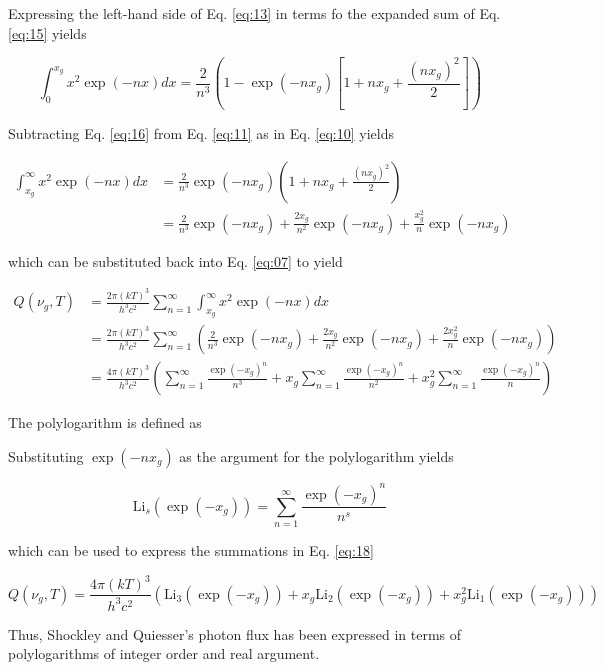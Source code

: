 \documentclass[letterpaper,12pt]{article}
\newcommand{\Li}{\textrm{Li}}
\begin{document}
\noindent Expressing the left-hand side of Eq. \ref{eq:13} in terms fo the expanded sum of Eq. \ref{eq:15} yields

\begin{equation} \label{eq:16}
\int_{0}^{x_{g}} x^{2} \exp(-nx) dx = \frac{2}{n^{3}} \left( 1 - \exp(-nx_{g}) \left[1 + nx_{g} + \frac{ (nx_{g})^{2} }{2} \right] \right)
\end{equation}

Subtracting Eq. \ref{eq:16} from Eq. \ref{eq:11} as in Eq. \ref{eq:10} yields

\begin{align} \label{eq:17}
\int_{x_{g}}^{\infty} x^{2} \exp(-nx) dx &= \frac{2}{n^{3}} \exp(-nx_{g}) \left( 1 + nx_{g} + \frac{ (nx_{g})^{2} }{2} \right) \nonumber \\
 &= \frac{2}{n^{3}} \exp(-nx_{g}) + \frac{2x_{g}}{n^{2}} \exp(-nx_{g}) + \frac{x_{g}^{2}}{n} \exp(-nx_{g})
\end{align}

\noindent which can be substituted back into Eq. \ref{eq:07} to yield

\begin{align} \label{eq:18}
Q(\nu_{g}, T) &= \frac{2\pi (kT)^{3}}{h^{3} c^{2}} \sum_{n = 1}^{\infty} \int_{x_{g}}^{\infty} x^{2} \exp(-nx) dx \nonumber \\
 &= \frac{2\pi (kT)^{3}}{h^{3} c^{2}} \sum_{n = 1}^{\infty} \left( \frac{2}{n^{3}} \exp(-nx_{g}) + \frac{2x_{g}}{n^{2}} \exp(-nx_{g}) + \frac{2x_{g}^{2}}{n} \exp(-nx_{g}) \right) \nonumber \\
 &= \frac{4\pi (kT)^{3}}{h^{3} c^{2}} \left(\sum_{n = 1}^{\infty} \frac{\exp(-x_{g})^{n}}{n^{3}} + x_{g} \sum_{n = 1}^{\infty} \frac{\exp(-x_{g})^{n}}{n^{2}} + x_{g}^{2} \sum_{n = 1}^{\infty} \frac{\exp(-x_{g})^{n}}{n} \right)
\end{align}

The polylogarithm is defined as

\noindent Substituting $\exp(-nx_{g})$ as the argument for the polylogarithm yields

\begin{equation} \label{eq:23}
\Li_{s} \left(\exp(-x_{g}) \right) = \sum_{n = 1}^{\infty} \frac{\exp(-x_{g})^{n}}{n^{s}}
\end{equation}

\noindent which can be used to express the summations in Eq. \ref{eq:18}

\begin{equation} \label{eq:24}
Q(\nu_{g}, T) = \frac{4\pi (kT)^{3}}{h^{3} c^{2}} \left(\Li_{3}(\exp(-x_{g})) + x_{g} \Li_{2}(\exp(-x_{g})) + x_{g}^{2} \Li_{1}(\exp(-x_{g})) \right) 
\end{equation}

\noindent Thus, Shockley and Quiesser's photon flux has been expressed in terms of polylogarithms of integer order and real argument.

% 
% 
\end{document}
